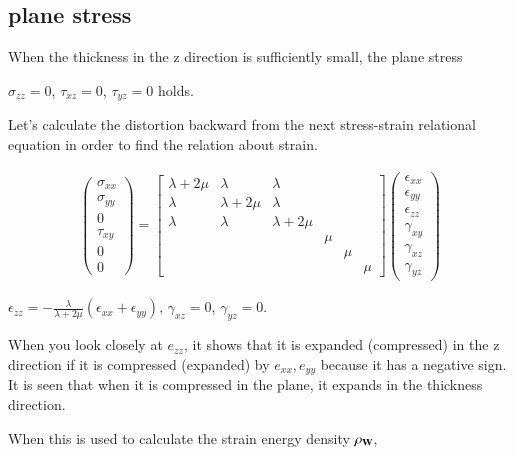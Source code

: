 \subsection{plane stress}


When the thickness in the z direction is sufficiently small, the plane stress

$\sigma_{zz}=0$, $\tau_{xz}=0$, $\tau_{yz}=0$ holds.

Let's calculate the distortion backward from the next stress-strain relational equation in order to find the relation about strain.

\begin{eqnarray}
\left(\begin{array}{l}
\sigma_{xx}\\
\sigma_{yy}\\
0\\
\tau_{xy}\\
0\\
0
\end{array}\right)=
\left[\begin{array}{llllll}
\lambda+2\mu & \lambda & \lambda\\
\lambda & \lambda+2\mu & \lambda\\
\lambda & \lambda & \lambda+2\mu\\
& & & \mu&   & \\
& & &    &\mu& \\
& & &    &   &\mu
\end{array}\right]
\left(\begin{array}{l}
\epsilon_{xx}\\
\epsilon_{yy}\\
\epsilon_{zz}\\
\gamma_{xy}\\
\gamma_{xz}\\
\gamma_{yz}
\end{array}\right)
\end{eqnarray}



$\epsilon_{zz}=-\frac{\lambda}{\lambda+2\mu}(\epsilon_{xx}+\epsilon_{yy})$, $\gamma_{xz}=0$, $\gamma_{yz}=0$.

When you look closely at $e_{zz}$, it shows that it is expanded (compressed) in the z direction if it is compressed (expanded) by $e_{xx},e_{yy}$ because it has a negative sign. It is seen that when it is compressed in the plane, it expands in the thickness direction.

When this is used to calculate the strain energy density $\rho_{\mathbf{W}}$,

